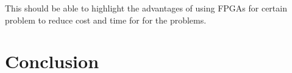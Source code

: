 \documentclass[12pt,twoside]{article}
\begin{document}
This should be able to highlight the advantages of using FPGAs for certain problem to reduce cost and time for
for the problems.

\section{Conclusion}
\label{sec:concl}


\printbibliography
\end{document}
